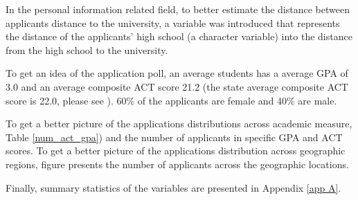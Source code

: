 \documentclass[12pt,english]{report}
\begin{document}
In the personal information related field, to better estimate the distance between applicants distance to the university, a variable was introduced that represents the distance of the applicants' high school (a character variable) into the distance from the high school to the university. 

To get an idea of the application poll, an average students has a average GPA of 3.0 and an average composite ACT score 21.2 (the state average composite ACT score is 22.0, please see \citet{mean_sat}). 60\% of the applicants are female and 40\% are male.  %
    
To get a better picture of the applications distributions across academic measure, Table \ref{num_act_gpa}) and the number of applicants in specific GPA and ACT scores. To get a better picture of the applications distribution across geographic regions, figure presents the number of applicants across the geographic locations. 

Finally, summary statistics of the variables are presented in Appendix \ref{app A}. 
\end{document}
